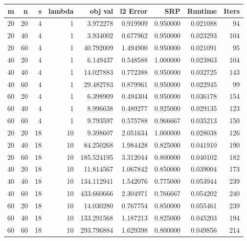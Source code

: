 \begin{tabular}{rrrrrrrrr}
\toprule
 m &  n &  s &  lambda &    obj val &  l2 Error &      SRP &  Runtime &  Iters \\
\midrule
20 & 20 &  4 &       1 &   3.972278 &  0.919909 & 0.950000 & 0.021088 &     94 \\
20 & 40 &  4 &       1 &   3.934002 &  0.677962 & 0.950000 & 0.023293 &    104 \\
20 & 60 &  4 &       1 &  40.792009 &  1.494900 & 0.950000 & 0.021091 &     95 \\
40 & 20 &  4 &       1 &   6.149437 &  0.548588 & 1.000000 & 0.023863 &    104 \\
40 & 40 &  4 &       1 &  14.027883 &  0.772388 & 0.950000 & 0.032725 &    143 \\
40 & 60 &  4 &       1 &  29.482783 &  0.879961 & 0.950000 & 0.022945 &     99 \\
60 & 20 &  4 &       1 &   6.398909 &  0.494304 & 0.950000 & 0.036178 &    154 \\
60 & 40 &  4 &       1 &   8.996638 &  0.489277 & 0.925000 & 0.029135 &    123 \\
60 & 60 &  4 &       1 &   9.793597 &  0.575788 & 0.966667 & 0.035213 &    150 \\
20 & 20 & 18 &      10 &   9.398607 &  2.051634 & 1.000000 & 0.028038 &    126 \\
20 & 40 & 18 &      10 &  84.250268 &  1.984428 & 0.825000 & 0.041910 &    190 \\
20 & 60 & 18 &      10 & 185.524195 &  3.312044 & 0.800000 & 0.040102 &    182 \\
40 & 20 & 18 &      10 &  11.814567 &  1.067842 & 0.850000 & 0.039004 &    173 \\
40 & 40 & 18 &      10 & 134.112941 &  1.542076 & 0.775000 & 0.053944 &    239 \\
40 & 60 & 18 &      10 & 433.660666 &  2.304971 & 0.766667 & 0.054202 &    240 \\
60 & 20 & 18 &      10 &  14.030280 &  0.767754 & 0.850000 & 0.055461 &    239 \\
60 & 40 & 18 &      10 & 133.291568 &  1.187213 & 0.825000 & 0.045203 &    194 \\
60 & 60 & 18 &      10 & 293.796884 &  1.629398 & 0.800000 & 0.049856 &    214 \\
\bottomrule
\end{tabular}
